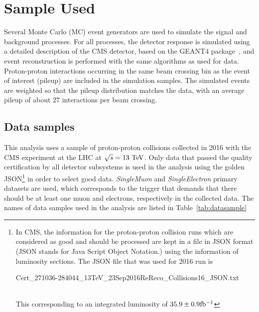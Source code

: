 





\section{Sample Used} %
\label{sec:sample_used}
Several Monte Carlo (MC) event generators are used to simulate the signal and
background processes. For all processes, the detector response is simulated using a detailed description of the CMS detector, based on the \textsc{GEANT4} 
package~\cite{Agostinelli:2002hh}, and event reconstruction is performed with
the same algorithms as used for data. Proton-proton interactions occurring in the same beam crossing bin as the event of interest (pileup) are included in the simulation samples. The simulated events are weighted so that the pileup distribution matches the data, with an average pileup of about $27$ interactions per beam crossing.

\subsection{Data samples}

This analysis uses a sample of proton-proton collisions collected in 2016 with the CMS experiment at the LHC at $\sqrt{s} = 13~\rm{TeV}$.
Only data that passed the quality certification by all detector subsystems is used in the analysis using the golden JSON\footnote{In CMS, the information for the proton-proton collision runs which are considered as good and should be processed are kept in a file in JSON format (JSON stands for Java Script Object Notation.) using the information of luminosity sections. The JSON file that was used for 2016 run is
\\
\centerline{\small Cert\_271036-284044\_13TeV\_23Sep2016ReReco\_Collisions16\_JSON.txt}\\
This corresponding to an integrated luminosity of $35.9 \pm 0.9\mathrm{fb^{-1}}$
} in order to select good data. {\it SingleMuon}  and {\it SingleElectron} primary datasets are used, which corresponds to the trigger that demands that there should be at least one muon and electrons, respectively in the collected data. The names of data samples used in the analysis are listed in Table~\ref{tab:datasample} 

